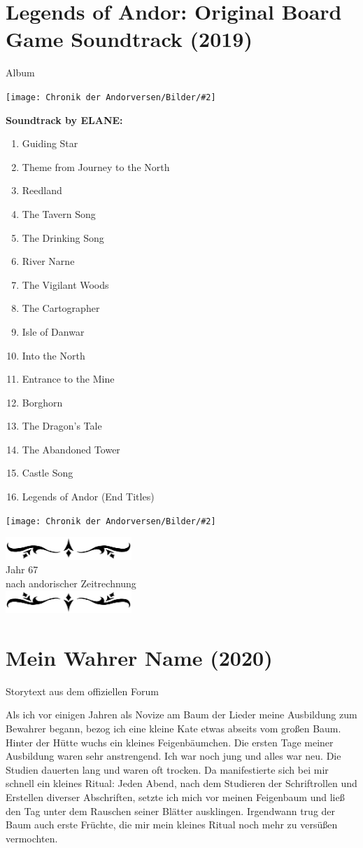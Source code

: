 \documentclass[10pt, a4paper, oneside]{book}
\newcommand{\fillbreak}{\vspace*{\fill}\columnbreak}
\newcommand{\produkt}[1]{%
    \section{#1}%
    \label{Produkt: #1}%
}
\newcommand{\storytext}[1]{%
    \section{#1}%
    \label{Storytext: #1}%
}
\newcommand{\bildmitts}[2][height=0.32\textwidth,width=0.48\textwidth,keepaspectratio]{%
    \begin{center}
        \texttt{[image: Chronik der Andorversen/Bilder/\#2]}
    \end{center}
}
\newcommand{\az}[1]{%
    \begin{center}
        \includegraphics[width=180px]{Chronik der Andorversen/verzierung1.png}\\
        {\Huge #1} \\
        {nach andorischer Zeitrechnung}\\
        \includegraphics[width=180px]{Chronik der Andorversen/verzierung2.png}
    \end{center}
    \extramarks{}{#1 a.Z.}
}
\begin{document}
\begin{multicols}{2}






\produkt{Legends of Andor: Original Board Game Soundtrack (2019)}

\begin{center}
    Album
\end{center}

\bildmitts{OBST (2019).jpg}



\textbf{Soundtrack by ELANE:}

\begin{enumerate}[topsep=0pt,itemsep=-1ex,partopsep=1ex,parsep=1ex]
    \item Guiding Star
    \item Theme from Journey to the North
    \item Reedland
    \item The Tavern Song
    \item The Drinking Song
    \item River Narne
    \item The Vigilant Woods
    \item The Cartographer
    \item Isle of Danwar
    \item Into the North
    \item Entrance to the Mine
    \item Borghorn
    \item The Dragon's Tale
    \item The Abandoned Tower
    \item Castle Song
    \item Legends of Andor (End Titles)
\end{enumerate}

\bildmitts{Baum der Lieder.jpg}







\fillbreak
\az{Jahr 67}

\storytext{Mein Wahrer Name (2020)}

\begin{center}
    Storytext aus dem offiziellen Forum
\end{center}

Als ich vor einigen Jahren als Novize am Baum der Lieder meine Ausbildung zum Bewahrer begann, bezog ich eine kleine Kate etwas abseits vom großen Baum. Hinter der Hütte wuchs ein kleines Feigenbäumchen. Die ersten Tage meiner Ausbildung waren sehr anstrengend. Ich war noch jung und alles war neu. Die Studien dauerten lang und waren oft trocken. Da manifestierte sich bei mir schnell ein kleines Ritual: Jeden Abend, nach dem Studieren der Schriftrollen und Erstellen diverser Abschriften, setzte ich mich vor meinen Feigenbaum und ließ den Tag unter dem Rauschen seiner Blätter ausklingen. Irgendwann trug der Baum auch erste Früchte, die mir mein kleines Ritual noch mehr zu versüßen vermochten.\bigskip


\end{multicols}
\end{document}
